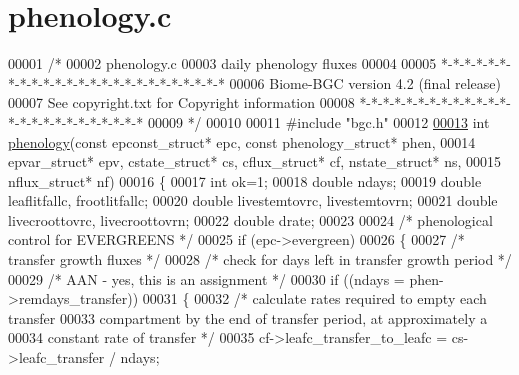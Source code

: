 \hypertarget{phenology_8c_source}{}\section{phenology.\+c}
\label{phenology_8c_source}

\begin{DoxyCode}
00001 \textcolor{comment}{/* }
00002 \textcolor{comment}{phenology.c}
00003 \textcolor{comment}{daily phenology fluxes}
00004 \textcolor{comment}{}
00005 \textcolor{comment}{*-*-*-*-*-*-*-*-*-*-*-*-*-*-*-*-*-*-*-*-*-*-*-*-*}
00006 \textcolor{comment}{Biome-BGC version 4.2 (final release)}
00007 \textcolor{comment}{See copyright.txt for Copyright information}
00008 \textcolor{comment}{*-*-*-*-*-*-*-*-*-*-*-*-*-*-*-*-*-*-*-*-*-*-*-*-*}
00009 \textcolor{comment}{*/}
00010 
00011 \textcolor{preprocessor}{#include "bgc.h"}
00012 
\hypertarget{phenology_8c_source_l00013}{}\hyperlink{phenology_8c_a4db88c2b8b0b2fd1265efd4ba86acd8f}{00013} \textcolor{keywordtype}{int} \hyperlink{phenology_8c_a4db88c2b8b0b2fd1265efd4ba86acd8f}{phenology}(\textcolor{keyword}{const} epconst\_struct* epc, \textcolor{keyword}{const} phenology\_struct* phen,
00014 epvar\_struct* epv, cstate\_struct* cs, cflux\_struct* cf, nstate\_struct* ns,
00015 nflux\_struct* nf)
00016 \{
00017     \textcolor{keywordtype}{int} ok=1;
00018     \textcolor{keywordtype}{double} ndays;
00019     \textcolor{keywordtype}{double} leaflitfallc, frootlitfallc;
00020     \textcolor{keywordtype}{double} livestemtovrc, livestemtovrn;
00021     \textcolor{keywordtype}{double} livecroottovrc, livecroottovrn;
00022     \textcolor{keywordtype}{double} drate;
00023     
00024     \textcolor{comment}{/* phenological control for EVERGREENS */}
00025     \textcolor{keywordflow}{if} (epc->evergreen)
00026     \{
00027         \textcolor{comment}{/* transfer growth fluxes */}
00028         \textcolor{comment}{/* check for days left in transfer growth period */}
00029         \textcolor{comment}{/* AAN - yes, this is an assignment */}
00030         \textcolor{keywordflow}{if} ((ndays = phen->remdays\_transfer))
00031         \{
00032             \textcolor{comment}{/* calculate rates required to empty each transfer}
00033 \textcolor{comment}{            compartment by the end of transfer period, at approximately a}
00034 \textcolor{comment}{            constant rate of transfer */}
00035             cf->leafc\_transfer\_to\_leafc = cs->leafc\_transfer / ndays;

\end{DoxyCode}
